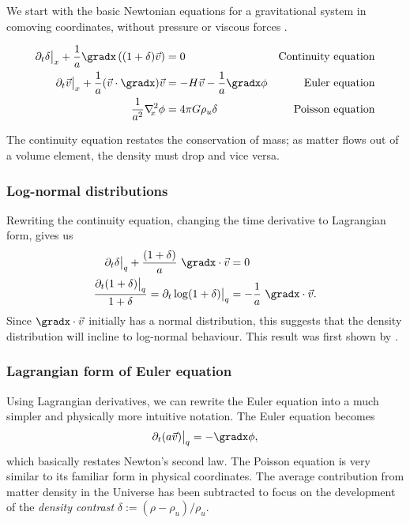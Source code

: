 \begin{subappendices}
We start with the basic Newtonian equations for a gravitational system in comoving coordinates, without pressure or viscous forces \citep{Peebles}.
\begin{shaded*}
\begin{align}
\partial_t \delta \big|_x + \frac{1}{a}\gradx\left((1 + \delta) \vec{v}\right) & = 0
    & \textrm{Continuity equation} \\
\partial_t \vec{v}\big|_x + \frac{1}{a}(\vec{v} \cdot \gradx)\vec{v}
    & = - H\vec{v}-\frac{1}{a}\gradx \phi
    & \textrm{Euler equation} \\
\frac{1}{a^2}\nabla_{\!\!x}^2 \phi & = 4\pi G \rho_u \delta %
    & \textrm{Poisson equation}
\end{align}
\end{shaded*}

The continuity equation restates the conservation of mass; as matter flows out of a volume
element, the density must drop and vice versa.


\subsubsection{Log-normal distributions}
Rewriting the continuity equation, changing
the time derivative to Lagrangian form, gives us
\begin{align}
\partial_t \delta \big|_q + \frac{(1 + \delta)}{a}\ \gradx \cdot \vec{v} &= 0\\
\frac{\partial_t (1 + \delta)\big|_q}{1 + \delta} = \partial_t \log(1 + \delta)\big|_q &= -\frac{1}{a}\ \gradx \cdot \vec{v}.
\end{align}
Since $\gradx\cdot\vec{v}$ initially has a normal distribution, this suggests that the density distribution will incline to
log-normal behaviour. This result was first shown by \citet{Coles1991}.

\subsubsection{Lagrangian form of Euler equation}
Using Lagrangian derivatives, we can rewrite the Euler equation into a much simpler and physically more intuitive notation. The Euler equation becomes
\[\partial_t (a \vec{v}) \big|_q = - \gradx \phi,\]
which basically restates Newton's second law. The Poisson equation is very similar to its familiar form in physical coordinates. The average contribution from matter density in the Universe has been subtracted to focus on the development of the \emph{density contrast} $\delta := (\rho - \rho_u)/\rho_u$.


\end{subappendices}
